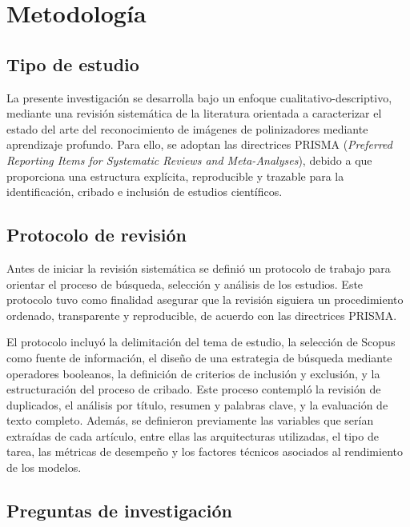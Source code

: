 \chapter{Metodología}

\section{Tipo de estudio}

La presente investigación se desarrolla bajo un enfoque cualitativo-descriptivo, mediante una revisión sistemática de la literatura orientada a caracterizar el estado del arte del reconocimiento de imágenes de polinizadores mediante aprendizaje profundo. Para ello, se adoptan las directrices PRISMA (\textit{Preferred Reporting Items for Systematic Reviews and Meta-Analyses}), debido a que proporciona una estructura explícita, reproducible y trazable para la identificación, cribado e inclusión de estudios científicos.


\section{Protocolo de revisión}

Antes de iniciar la revisión sistemática se definió un protocolo de trabajo para orientar el proceso de búsqueda, selección y análisis de los estudios. Este protocolo tuvo como finalidad asegurar que la revisión siguiera un procedimiento ordenado, transparente y reproducible, de acuerdo con las directrices PRISMA.

El protocolo incluyó la delimitación del tema de estudio, la selección de Scopus como fuente de información, el diseño de una estrategia de búsqueda mediante operadores booleanos, la definición de criterios de inclusión y exclusión, y la estructuración del proceso de cribado. Este proceso contempló la revisión de duplicados, el análisis por título, resumen y palabras clave, y la evaluación de texto completo. Además, se definieron previamente las variables que serían extraídas de cada artículo, entre ellas las arquitecturas utilizadas, el tipo de tarea, las métricas de desempeño y los factores técnicos asociados al rendimiento de los modelos.

\section{Preguntas de investigación}

